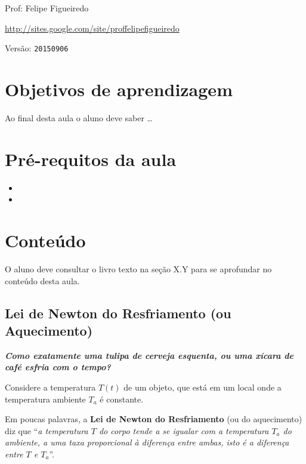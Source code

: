 \documentclass[a4paper]{article}
\begin{document}
\parbox[c]{.825\textwidth}{\raggedright%
{Prof: Felipe Figueiredo\par}
{\url{http://sites.google.com/site/proffelipefigueiredo}\par}
}

Versão: \verb|20150906|



\section{Objetivos de aprendizagem}

Ao final desta aula o aluno deve saber \ldots


\section{Pré-requitos da aula}

\begin{itemize}
\item 
\item 
\end{itemize}

\section{Conteúdo}

O aluno deve consultar o livro texto na seção X.Y para se aprofundar
no conteúdo desta aula.

\subsection{Lei de Newton do Resfriamento (ou Aquecimento)}

{\bf \em Como exatamente uma tulipa de cerveja esquenta, ou uma xícara
  de café esfria com o tempo?}

Considere a temperatura $T(t)$ de um objeto, que está em um local onde
a temperatura ambiente $T_a$ é constante.

Em poucas palavras, a {\bf Lei de Newton do Resfriamento} (ou do
aquecimento) diz que ``{\em a temperatura $T$ do corpo tende a se
  igualar com a temperatura $T_a$ do ambiente, a uma taxa proporcional
  à diferença entre ambas, isto é a diferença entre $T$ e $T_a$}''.
\end{document}
